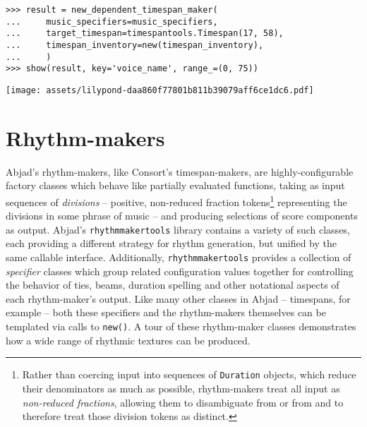\begin{abjadbookoutput}
\begin{singlespacing}
\vspace{-0.5\baselineskip}
\begin{verbatim}
>>> result = new_dependent_timespan_maker(
...     music_specifiers=music_specifiers,
...     target_timespan=timespantools.Timespan(17, 58),
...     timespan_inventory=new(timespan_inventory),
...     )
>>> show(result, key='voice_name', range_=(0, 75))
\end{verbatim}
\noindent\texttt{[image: assets/lilypond-daa860f77801b811b39079aff6ce1dc6.pdf]}
\end{singlespacing}
\end{abjadbookoutput}

\section{Rhythm-makers}
\label{sec:rhythm-makers}

Abjad's rhythm-makers, like Consort's timespan-makers, are highly-configurable
factory classes which behave like partially evaluated functions, taking as
input sequences of \emph{divisions} -- positive, non-reduced fraction
tokens\footnote{Rather than coercing input into sequences of \texttt{Duration}
objects, which reduce their denominators as much as possible, rhythm-makers
treat all input as \emph{non-reduced fractions}, allowing them to disambiguate
 from  or  from  and to
therefore treat those division tokens as distinct.} representing the divisions
in some phrase of music -- and producing selections of score components as
output. Abjad's \texttt{rhythmmakertools} library contains a variety of such
classes, each providing a different strategy for rhythm generation, but unified
by the same callable interface. Additionally, \texttt{rhythmmakertools}
provides a collection of \emph{specifier} classes which group related
configuration values together for controlling the behavior of ties, beams,
duration spelling and other notational aspects of each rhythm-maker's output.
Like many other classes in Abjad -- timespans, for example -- both these
specifiers and the rhythm-makers themselves can be templated via calls to
\texttt{new()}. A tour of these rhythm-maker classes demonstrates how a wide
range of rhythmic textures can be produced.

